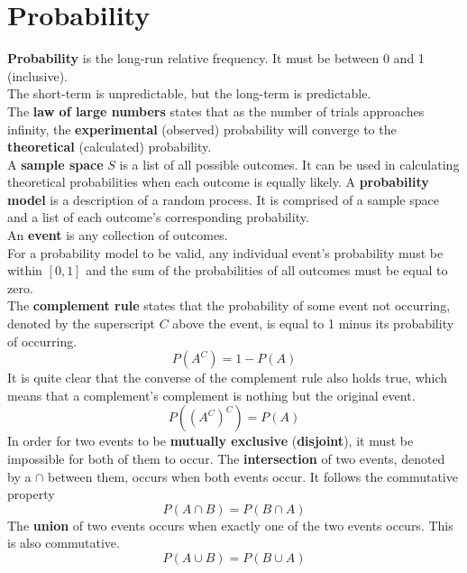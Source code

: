 \documentclass[../AP_Statistics.tex]{subfiles}
\begin{document}
	\chapter{Probability}
		\textbf{Probability} is the long-run relative frequency. It must be between 0 and 1 (inclusive). \\
		The short-term is unpredictable, but the long-term is predictable. \\
		The \textbf{law of large numbers} states that as the number of trials approaches infinity, the \textbf{experimental} (observed) probability will converge to the \textbf{theoretical} (calculated) probability. \\
		A \textbf{sample space} $S$ is a list of all possible outcomes. It can be used in calculating theoretical probabilities when each outcome is equally likely.
		A \textbf{probability model} is a description of a random process. It is comprised of a sample space and a list of each outcome's corresponding probability. \\
		An \textbf{event} is any collection of outcomes. \\
		For a probability model to be valid, any individual event's probability must be within $[0, 1]$ and the sum of the probabilities of all outcomes must be equal to zero. \\
		The \textbf{complement rule} states that the probability of some event not occurring, denoted by the superscript $C$ above the event, is equal to 1 minus its probability of occurring. \\
		\[P\left(A^C\right) = 1 - P(A)\]
		It is quite clear that the converse of the complement rule also holds true, which means that a complement's complement is nothing but the original event. 
		\[P\left(\left(A^C\right)^C\right) = P(A)\]
		In order for two events to be \textbf{mutually exclusive} (\textbf{disjoint}), it must be impossible for both of them to occur.
		The \textbf{intersection} of two events, denoted by a $\cap$ between them, occurs when both events occur. It follows the commutative property
		\[P(A\cap B) = P(B\cap A)\]
		The \textbf{union} of two events occurs when exactly one of the two events occurs. This is also commutative. \\
		\[P(A\cup B) = P(B\cup A)\]
\end{document}
